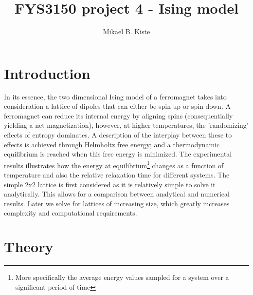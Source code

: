 \documentclass[a4paper, 12pt]{article}
\author{Mikael B. Kiste}
\title{FYS3150 project 4 - Ising model}
\begin{document}
\maketitle

	
\tableofcontents \newpage

\section{Introduction}
	In its essence, the two dimensional Ising model of a ferromagnet takes into consideration a lattice of dipoles that can either be spin up or spin down. A ferromagnet can reduce its internal energy by aligning spins (consequentially yielding a net magnetization), however, at higher temperatures, the 'randomizing' effects of entropy dominates. A description of the interplay between these to effects is achieved through Helmholtz free energy; and a thermodynamic equilibrium is reached when this free energy is minimized. The experimental results illustrates how the energy at equilibrium\footnote{More specifically the average energy values sampled for a system over a significant period of time} changes as a function of temperature and also the relative relaxation time for different systems.
	The simple 2x2 lattice is first considered as it is relatively simple to solve it analytically. This allows for a comparison between analytical and numerical results.
	Later we solve for lattices of increasing size, which greatly increases complexity and computational requirements.

	\newpage

\section{Theory}
\end{document}
